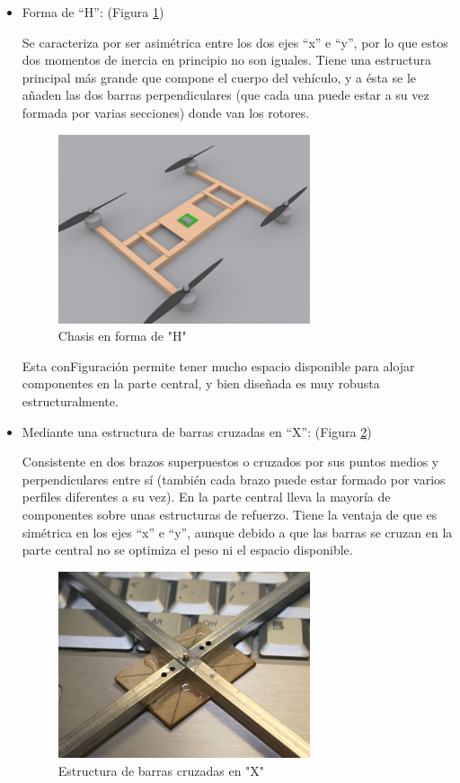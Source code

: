 \documentclass[12pt,twoside]{article}
\begin{document}
		\begin{itemize}
			\item Forma de “H”: (Figura \ref{fig:chasis_H}) 

Se caracteriza por ser asimétrica entre los dos ejes “x” e “y”, por lo que estos dos momentos de inercia en principio no son iguales. Tiene una estructura principal más grande que compone el cuerpo del vehículo, y a ésta se le añaden las dos barras perpendiculares (que cada una puede estar a su vez formada por varias secciones) donde van los rotores.

		\begin{figure}
			\centering
			\includegraphics[width=0.7\textwidth]{Imatges/Disseny_Chasis/quadH.png}
			\caption{Chasis en forma de "H"}
			\label{fig:chasis_H}
		\end{figure}

Esta conFiguración permite tener mucho espacio disponible para alojar componentes en la parte central, y bien diseñada es muy robusta estructuralmente.
			
		\item Mediante una estructura de barras cruzadas en “X”:  (Figura \ref{fig:chasis_X})

Consistente en dos brazos superpuestos o cruzados por sus puntos medios y perpendiculares entre sí (también cada brazo puede estar formado por varios perfiles diferentes a su vez). En la parte central lleva la mayoría de componentes sobre unas estructuras de refuerzo. Tiene la ventaja de que es simétrica en los ejes “x” e “y”, aunque debido a que las barras se cruzan en la parte central no se optimiza el peso ni el espacio disponible.
		\begin{figure}
			\centering
			\includegraphics[width=0.7\textwidth]{Imatges/Disseny_Chasis/Chasis_barras_enteras.png}
			\caption{Estructura de barras cruzadas en "X"}
			\label{fig:chasis_X}
		\end{figure}


\end{itemize}
\end{document}
